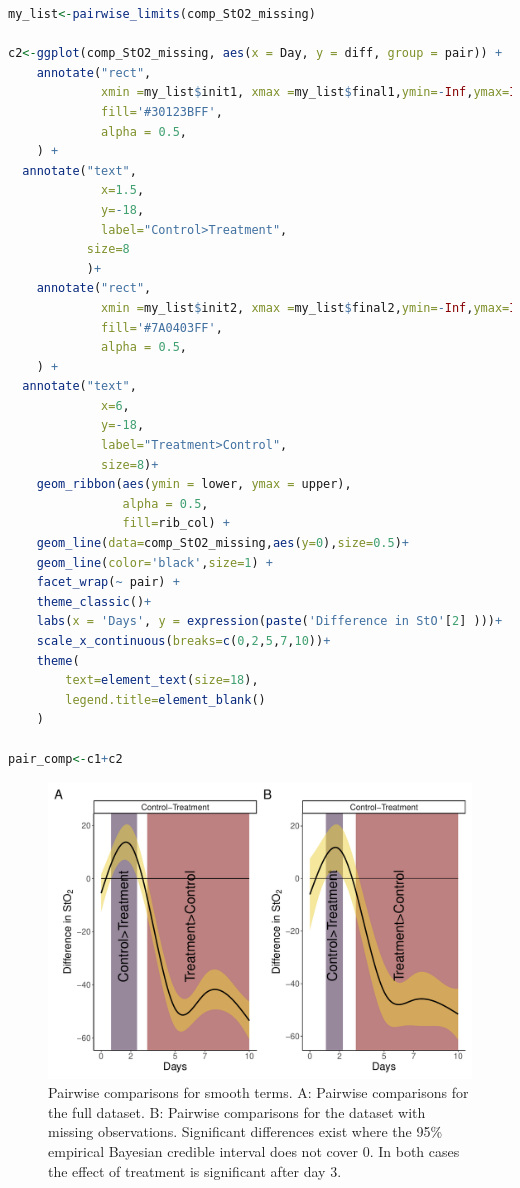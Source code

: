 \documentclass[
]{article}
\begin{document}
\begin{lstlisting}[language=R]
my_list<-pairwise_limits(comp_StO2_missing)

c2<-ggplot(comp_StO2_missing, aes(x = Day, y = diff, group = pair)) +
    annotate("rect",
             xmin =my_list$init1, xmax =my_list$final1,ymin=-Inf,ymax=Inf,
             fill='#30123BFF',
             alpha = 0.5,
    ) +
  annotate("text",
             x=1.5,
             y=-18,
             label="Control>Treatment",
           size=8
           )+
    annotate("rect",
             xmin =my_list$init2, xmax =my_list$final2,ymin=-Inf,ymax=Inf,
             fill='#7A0403FF',
             alpha = 0.5,
    ) +
  annotate("text",
             x=6,
             y=-18,
             label="Treatment>Control",
             size=8)+
    geom_ribbon(aes(ymin = lower, ymax = upper),
                alpha = 0.5,
                fill=rib_col) +
    geom_line(data=comp_StO2_missing,aes(y=0),size=0.5)+
    geom_line(color='black',size=1) +
    facet_wrap(~ pair) +
    theme_classic()+
    labs(x = 'Days', y = expression(paste('Difference in StO'[2] )))+
    scale_x_continuous(breaks=c(0,2,5,7,10))+
    theme(
        text=element_text(size=18),
        legend.title=element_blank()
    )

pair_comp<-c1+c2
\end{lstlisting}

\begin{figure}[H]

{\centering \includegraphics[width=0.75\linewidth,]{00-Full_document_files/figure-latex/plot-pairwise-comp-Appendix-1} 

}

\caption{Pairwise comparisons for smooth terms. A: Pairwise comparisons for the full dataset. B: Pairwise comparisons for the dataset with missing observations. Significant differences exist where the 95\% empirical Bayesian credible interval does not cover 0. In both cases the effect of treatment is significant after day 3.}\label{fig:plot-pairwise-comp-Appendix}
\end{figure}
\end{document}

